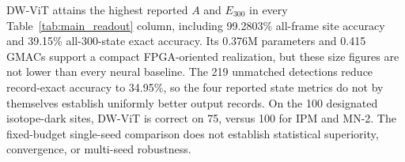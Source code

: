 DW-ViT attains the highest reported $A$ and $E_{300}$ in every Table~\ref{tab:main_readout} column, including 99.2803\% all-frame site accuracy and 39.15\% all-300-state exact accuracy. Its 0.376M parameters and 0.415 GMACs support a compact FPGA-oriented realization, but these size figures are not lower than every neural baseline. The 219 unmatched detections reduce record-exact accuracy to 34.95\%, so the four reported state metrics do not by themselves establish uniformly better output records. On the 100 designated isotope-dark sites, DW-ViT is correct on 75, versus 100 for IPM and MN-2. The fixed-budget single-seed comparison does not establish statistical superiority, convergence, or multi-seed robustness.
